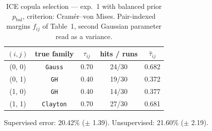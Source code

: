 \begin{table}[htbp]
  \centering
  \caption{ICE copula selection — exp.\ 1 with balanced prior $p_{\text{bal}}$, criterion: Cram\'er--von Mises. Pair-indexed margins $f_{ij}$ of Table~1, second Gaussian parameter read as a variance.}
  \label{tab:exp3-exp1_bal_p__cvm}
  \begin{tabular}{ccccc}
    \toprule
    $(i, j)$ & true family & $\tau_{ij}$ & hits / runs & $\hat\tau_{ij}$ \\
    \midrule
    (0, 0) & \texttt{Gauss} & 0.70 & 24/30 & 0.682 \\
    (0, 1) & \texttt{GH} & 0.40 & 19/30 & 0.372 \\
    (1, 0) & \texttt{GH} & 0.40 & 14/30 & 0.377 \\
    (1, 1) & \texttt{Clayton} & 0.70 & 27/30 & 0.681 \\
    \bottomrule
  \end{tabular}
  \par\smallskip Supervised error: 20.42\% ($\pm$ 1.39). Unsupervised: 21.60\% ($\pm$ 2.19).
\end{table}
